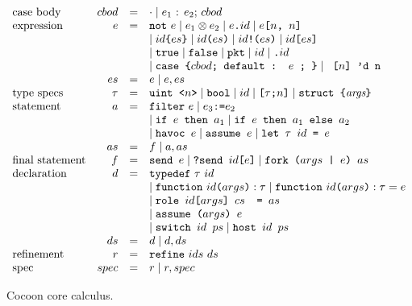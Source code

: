 \documentclass{report}
\begin{document}
\begin{figure}
\[\begin{array}{lrcl}
\textrm{case body} & cbod & = & \cdot \mid \textrm{$e_1$ : $e_2$; } cbod \\
\textrm{expression} & e & = & \texttt{not}~e \mid e_1 \otimes e_2 \mid e \texttt{.} id \mid e \texttt{[$n$, $n$]} \\
              &   &   &  \mid \texttt{$id$\{$es$\}} \mid \texttt{$id$($es$)} \mid \texttt{$id$!($es$)} \mid \texttt{$id$[$es$]} \\
              &   &   &  \mid \texttt{true} \mid \texttt{false} \mid \texttt{pkt} \mid id \mid \texttt{.$id$} \\
              &   &   &  \mid \texttt{case \{$cbod$; default : $e$ ; \}} \mid \texttt{ [$n$]~'d~n } \\
              & es & = & e \mid e, es \\
\textrm{type specs} & \tau & = & \texttt{uint <} n \texttt{>}
                                 \mid \texttt{bool}
                                 \mid id
                                 \mid \texttt{[} \tau \texttt{;} n \texttt{]}
                                 \mid \texttt{struct \{} \textit{args} \texttt{\}} \\
\textrm{statement} & a & = & \texttt{filter}~e \mid e_3 \texttt{:=} e_2  \\
                   &   &   & \mid \texttt{if $e$ then $a_1$} \mid \texttt{if $e$ then $a_1$ else $a_2$} \\
                   &   &   & \mid \texttt{havoc $e$} \mid \texttt{assume $e$} \mid \texttt{let $\tau$ $id$ = $e$} \\
                   & as & = & f \mid a, as \\
\textrm{final statement} & f & = & \texttt{send $e$} \mid \texttt{?send $id$[$e$]} \mid 
                            \texttt{fork ($args$ | $e$) $as$}\\
\textrm{declaration} & d & = & \texttt{typedef}~\tau~id \\
                     &   &   & \mid \texttt{function}~id \texttt{(} args \texttt{)} : \tau \mid \texttt{function}~id \texttt{(} args \texttt{)} : \tau = e \\
                     &   &   & \mid \texttt{role~$id$\texttt{[}$args$\texttt{]}~$cs$~ = $as$} \\
                     &   &   & \mid \texttt{assume ($args$) $e$} \\ %
                     &   &   & \mid \texttt{switch $id$ $ps$} \mid \texttt{host $id$ $ps$} \\
                     & ds & = & d \mid d, ds \\
\textrm{refinement} & r & = & \texttt{refine}~ids~ds \\
\textrm{spec} & spec & = & r \mid r, spec \\

\end{array} \]
\caption{Cocoon core calculus.}
\label{fig:core_calc}
\end{figure}
\end{document}
